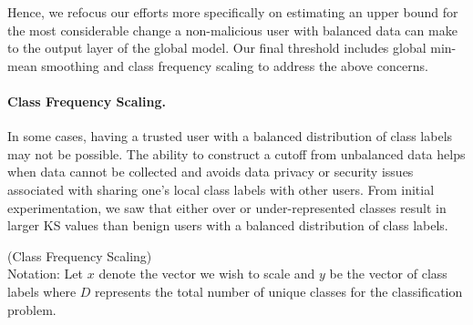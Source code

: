 \documentclass{article} %
\begin{document}
Hence, we refocus our efforts more specifically on estimating an upper bound for the most considerable change a non-malicious user with balanced data can make to the output layer of the global model. Our final threshold includes global min-mean smoothing and class frequency scaling to address the above concerns.

%
\paragraph{Class Frequency Scaling.} In some cases, having a trusted user with a balanced distribution of class labels may not be possible. The ability to construct a cutoff from unbalanced data helps when data cannot be collected and avoids data privacy or security issues associated with sharing one's local class labels with other users. From initial experimentation, we saw that either over or under-represented classes result in larger KS values than benign users with a balanced distribution of class labels. 

\begin{algorithm}[H]
\caption{ (Class Frequency Scaling) \\ 
Notation: Let $x$ denote the vector we wish to scale and $y$ be the vector of class labels where $D$ represents the total number of unique classes for the classification problem. 
}
\label{alg:smoothing}
\begin{algorithmic}[1]
        \EndFor
    \EndProcedure
\end{algorithmic}
\end{algorithm}
\end{document}
